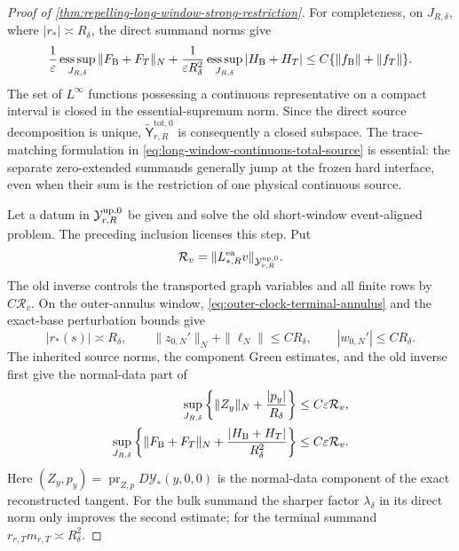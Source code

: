 \begin{proof}[Proof of
\cref{thm:repelling-long-window-strong-restriction}]
For completeness, on \(J_{R,\delta}\), where \(|r_*|\asymp R_\delta\),
the direct summand norms give
\begin{equation}
 \frac1\varepsilon\operatorname*{ess\,sup}_{J_{R,\delta}}
       \|F_{\rm B}+F_T\|_N
 +\frac1{\varepsilon R_\delta^2}
   \operatorname*{ess\,sup}_{J_{R,\delta}}|H_{\rm B}+H_T|
 \le C\{\|f_{\rm B}\|+\|f_T\|\}.             \label{eq:proof-total-source-sum-map}
\end{equation}
The set of \(L^\infty\) functions possessing a continuous representative
on a compact interval is closed in the essential-supremum norm.  Since the
direct source decomposition is unique,
\(\widetilde{\mathsf Y}_{r,R}^{\mathrm{tot},0}\) is consequently a closed
subspace.
The trace-matching formulation in
\cref{eq:long-window-continuous-total-source} is essential: the separate
zero-extended summands generally jump at the frozen hard interface, even
when their sum is the restriction of one physical continuous source.

Let a datum in \(\mathcal Y_{r,R}^{\rm up,0}\) be given and solve the old
short-window event-aligned problem.  The preceding inclusion licenses this
step.  Put
\begin{equation}
 \mathcal R_v=\|L_{*,R}^{\rm ea}v\|_{\mathcal Y_{r,R}^{\rm up,0}}.
                                                        \label{eq:proof-long-window-range-size}
\end{equation}
The old inverse controls the transported graph variables and all finite
rows by \(C\mathcal R_v\).  On the outer-annulus window,
\cref{eq:outer-clock-terminal-annulus} and the exact-base perturbation
bounds give
\begin{equation}
 |r_*(s)|\asymp R_\delta,\qquad
 \|z_{0,N}'\|_N+\|\ell_N\|\le CR_\delta,\qquad
 |w_{0,N}'|\le CR_\delta.                       \label{eq:proof-long-window-coefficients}
\end{equation}
The inherited source norms, the component Green estimates, and the old
inverse first give the normal-data part of
\begin{align}
 \sup_{J_{R,\delta}}
  \left\{\|Z_y\|_N+\frac{|p_y|}{R_\delta}\right\}
 &\le C\varepsilon\mathcal R_v,
                                                        \label{eq:proof-long-window-normal-data-state-bound}\\
 \sup_{J_{R,\delta}}
  \left\{\|F_{\rm B}+F_T\|_N
       +\frac{|H_{\rm B}+H_T|}{R_\delta^2}\right\}
 &\le C\varepsilon\mathcal R_v.                \label{eq:proof-long-window-source-bound}
\end{align}
Here
\((Z_y,p_y)=\operatorname{pr}_{Z,p}D\mathcal Y_*(y,0,0)\) is the
normal-data component of the exact reconstructed tangent.
For the bulk summand the sharper factor \(\lambda_\delta\) in its direct
norm only improves the second estimate;
for the terminal summand
\(r_{r,T}m_{r,T}\asymp R_\delta^2\).


\end{proof}
